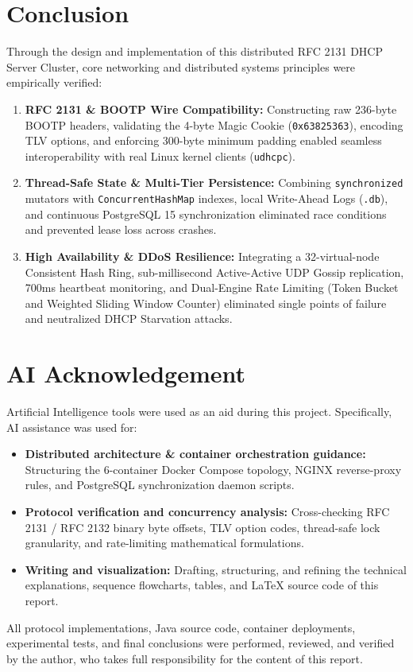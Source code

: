 \documentclass[11pt,a4paper]{article}
\begin{document}
\section{Conclusion}
Through the design and implementation of this distributed RFC 2131 DHCP Server Cluster, core networking and distributed systems principles were empirically verified:
\begin{enumerate}[leftmargin=2em]
    \item \textbf{RFC 2131 \& BOOTP Wire Compatibility:} Constructing raw 236-byte BOOTP headers, validating the 4-byte Magic Cookie (\texttt{0x63825363}), encoding TLV options, and enforcing 300-byte minimum padding enabled seamless interoperability with real Linux kernel clients (\texttt{udhcpc}).
    \item \textbf{Thread-Safe State \& Multi-Tier Persistence:} Combining \texttt{synchronized} mutators with \texttt{ConcurrentHashMap} indexes, local Write-Ahead Logs (\texttt{.db}), and continuous PostgreSQL 15 synchronization eliminated race conditions and prevented lease loss across crashes.
    \item \textbf{High Availability \& DDoS Resilience:} Integrating a 32-virtual-node Consistent Hash Ring, sub-millisecond Active-Active UDP Gossip replication, 700ms heartbeat monitoring, and Dual-Engine Rate Limiting (Token Bucket and Weighted Sliding Window Counter) eliminated single points of failure and neutralized DHCP Starvation attacks.
\end{enumerate}

\section*{AI Acknowledgement}
Artificial Intelligence tools were used as an aid during this project. Specifically, AI assistance was used for:
\begin{itemize}[leftmargin=2em]
    \item \textbf{Distributed architecture \& container orchestration guidance:} Structuring the 6-container Docker Compose topology, NGINX reverse-proxy rules, and PostgreSQL synchronization daemon scripts.
    \item \textbf{Protocol verification and concurrency analysis:} Cross-checking RFC 2131 / RFC 2132 binary byte offsets, TLV option codes, thread-safe lock granularity, and rate-limiting mathematical formulations.
    \item \textbf{Writing and visualization:} Drafting, structuring, and refining the technical explanations, sequence flowcharts, tables, and \LaTeX{} source code of this report.
\end{itemize}
All protocol implementations, Java source code, container deployments, experimental tests, and final conclusions were performed, reviewed, and verified by the author, who takes full responsibility for the content of this report.
\end{document}
